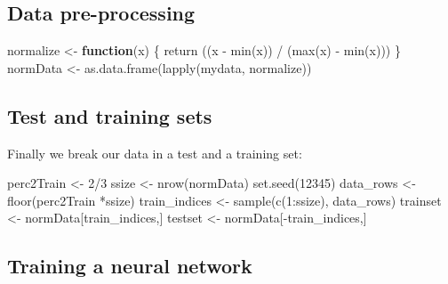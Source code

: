 \documentclass[
  letterpaper,
  DIV=11,
  numbers=noendperiod,
  oneside]{scrartcl}
\newenvironment{Shaded}{\begin{snugshade}}{\end{snugshade}}
\newcommand{\ControlFlowTok}[1]{\textcolor[rgb]{0.00,0.23,0.31}{\textbf{#1}}}
\newcommand{\DecValTok}[1]{\textcolor[rgb]{0.68,0.00,0.00}{#1}}
\newcommand{\FunctionTok}[1]{\textcolor[rgb]{0.28,0.35,0.67}{#1}}
\newcommand{\NormalTok}[1]{\textcolor[rgb]{0.00,0.23,0.31}{#1}}
\newcommand{\OtherTok}[1]{\textcolor[rgb]{0.00,0.23,0.31}{#1}}
\newcommand{\SpecialCharTok}[1]{\textcolor[rgb]{0.37,0.37,0.37}{#1}}
\begin{document}
\subsection{Data pre-processing}\label{data-pre-processing}

\begin{Shaded}
\begin{Highlighting}[]
\NormalTok{normalize }\OtherTok{\textless{}{-}} \ControlFlowTok{function}\NormalTok{(x) \{}
  \FunctionTok{return}\NormalTok{ ((x }\SpecialCharTok{{-}} \FunctionTok{min}\NormalTok{(x)) }\SpecialCharTok{/}\NormalTok{ (}\FunctionTok{max}\NormalTok{(x) }\SpecialCharTok{{-}} \FunctionTok{min}\NormalTok{(x)))}
\NormalTok{\}}
\NormalTok{normData }\OtherTok{\textless{}{-}} \FunctionTok{as.data.frame}\NormalTok{(}\FunctionTok{lapply}\NormalTok{(mydata, normalize))}
\end{Highlighting}
\end{Shaded}

\subsection{Test and training sets}\label{test-and-training-sets}

Finally we break our data in a test and a training set:

\begin{Shaded}
\begin{Highlighting}[]
\NormalTok{perc2Train }\OtherTok{\textless{}{-}} \DecValTok{2}\SpecialCharTok{/}\DecValTok{3}
\NormalTok{ssize }\OtherTok{\textless{}{-}} \FunctionTok{nrow}\NormalTok{(normData)}
\FunctionTok{set.seed}\NormalTok{(}\DecValTok{12345}\NormalTok{)}
\NormalTok{data\_rows }\OtherTok{\textless{}{-}} \FunctionTok{floor}\NormalTok{(perc2Train }\SpecialCharTok{*}\NormalTok{ssize)}
\NormalTok{train\_indices }\OtherTok{\textless{}{-}} \FunctionTok{sample}\NormalTok{(}\FunctionTok{c}\NormalTok{(}\DecValTok{1}\SpecialCharTok{:}\NormalTok{ssize), data\_rows)}
\NormalTok{trainset }\OtherTok{\textless{}{-}}\NormalTok{ normData[train\_indices,]}
\NormalTok{testset }\OtherTok{\textless{}{-}}\NormalTok{ normData[}\SpecialCharTok{{-}}\NormalTok{train\_indices,]}
\end{Highlighting}
\end{Shaded}

\subsection{Training a neural network}\label{training-a-neural-network}
\end{document}
